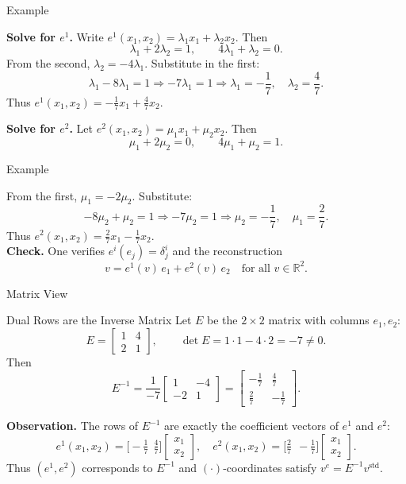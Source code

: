 \begin{frame}{Example}
    \begin{block}{}
        \textbf{Solve for $e^1$.} Write $e^1(x_1,x_2)=\lambda_1 x_1+\lambda_2 x_2$. Then
\[
\lambda_1+2\lambda_2=1,\qquad 4\lambda_1+\lambda_2=0.
\]
From the second, $\lambda_2=-4\lambda_1$. Substitute in the first:
\[
\lambda_1-8\lambda_1=1 \Rightarrow -7\lambda_1=1 \Rightarrow \lambda_1=-\frac{1}{7},\quad \lambda_2=\frac{4}{7}.
\]
Thus $e^1(x_1,x_2)=-\frac{1}{7}x_1+\frac{4}{7}x_2$.

\textbf{Solve for $e^2$.} Let $e^2(x_1,x_2)=\mu_1 x_1+\mu_2 x_2$. Then
\[
\mu_1+2\mu_2=0,\qquad 4\mu_1+\mu_2=1.
\]
\end{block}    
\end{frame}
\begin{frame}{Example}
\begin{block}{}
    From the first, $\mu_1=-2\mu_2$. Substitute:
\[
-8\mu_2+\mu_2=1 \Rightarrow -7\mu_2=1 \Rightarrow \mu_2=-\frac{1}{7},\quad \mu_1=\frac{2}{7}.
\]
Thus $e^2(x_1,x_2)=\frac{2}{7}x_1-\frac{1}{7}x_2$.\\

\textbf{Check.} One verifies $e^i(e_j)=\delta^i_j$ and the reconstruction
\[
v = e^1(v)\,e_1 + e^2(v)\,e_2 \quad \text{for all } v\in \mathbb{R}^2.
\]
    \end{block}
    
\end{frame}

\begin{frame}{Matrix View}
\vspace{-0.2cm}
\begin{block}{Dual Rows are the Inverse Matrix}
    Let $E$ be the $2\times 2$ matrix with columns $e_1,e_2$:
\[
E=
\begin{bmatrix}
1 & 4\\
2 & 1
\end{bmatrix},\qquad \det E = 1\cdot 1 - 4\cdot 2 = -7\neq 0.
\]
Then
\[
E^{-1}=\frac{1}{-7}
\begin{bmatrix}
1 & -4\\
-2 & 1
\end{bmatrix}
=
\begin{bmatrix}
-\tfrac{1}{7} & \tfrac{4}{7}\\[2pt]
\tfrac{2}{7} & -\tfrac{1}{7}
\end{bmatrix}.
\]
\end{block}
\vspace{-0.2cm}
\textbf{Observation.} The rows of $E^{-1}$ are exactly the coefficient vectors of $e^1$ and $e^2$:
\[
e^1(x_1,x_2)=\bigl[-\tfrac{1}{7}\ \ \tfrac{4}{7}\bigr]\!\begin{bmatrix}x_1\\ x_2\end{bmatrix},\quad
e^2(x_1,x_2)=\bigl[\tfrac{2}{7}\ \ -\tfrac{1}{7}\bigr]\!\begin{bmatrix}x_1\\ x_2\end{bmatrix}.
\]
Thus $(e^1,e^2)$ corresponds to $E^{-1}$ and $(\cdot)$-coordinates satisfy $v^e=E^{-1} v^{\text{std}}$.
\end{frame}

